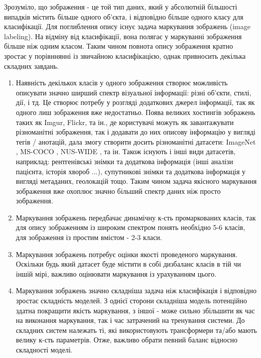 \documentclass{udstu}
\begin{document}
Зрозуміло, що зображення - це той тип даних, який у абсолютній більшості випадків містить більше одного об'єкта,
і відповідно більше одного класу для класифікації.
Для поглиблення опису існує задача маркування зображень (image labeling).
На відміну від класифікації, вона полягає у маркуванні зображення більше ніж одним класом.
Таким чином повнота опису зображення кратно зростає у порівннянні із звичайною класифікацією,
однак привносить декілька складних завдань.

\begin{enumerate}[1)]
	\item Наявність декількох класів у одного зображення створює можливість
описувати значно ширший спектр візуальної інформації: різні об'єкти, стилі, дії, і тд.
Це створює потребу у розгляді додаткових джерел інформації, так як одного лиш зображення вже недостатньо.
Поява великих хостингів зображень таких як Imgur, Flickr, та ін., де користувачі можуть
як завантажувати різноманітні зображення, так і додавати до них описову інформацію у вигляді
тегів / анотацій, дала змогу створити досить різноманітні датасети: ImageNet \cite{deng2009imagenet},
MS-COCO \cite{cocodataset}, NUS-WIDE \cite{nus-wide-civr09}, та ін. Також існують і інші види датасетів,
наприклад: рентгенівські знімки та додаткова інформація (інші аналізи пацієнта, історія хвороб ...),
супутникові знімки та додаткова інформація у вигляді метаданих, геолокацій тощо.
Таким чином задача якісного маркування зображення вже охоплює значно більший спектр даних ніж просто
зображення.

	\item Маркування зображень передбачає динамічну к-сть промаркованих класів,
так для опису зображенням із широким спектром понять необхідно 5-6 класів,
для зображення із простим вмістом - 2-3 класи.

	\item Маркування зображень потребує оцінки якості проведеного маркування. Оскільки будь який
датасет буде містити в собі дизбаланс класів в тій чи іншій мірі, важливо оцінювати маркування із
урахуванням цього.

	\item Маркування зображень значно складніша задача ніж класифікація і відповідно зростає
складність моделей. З однієї сторони складніша модель потенційно здатна покращити якість маркування,
з іншої - може сильно збільшити як час на виконання маркування, так і час затрачений на тренування системи.
До складних систем належать ті, які використовують трансформери та/або мають велику к-сть параметрів.
Отже, важливо обрати певний баланс відносно складності моделі.
\end{enumerate}
\end{document}
